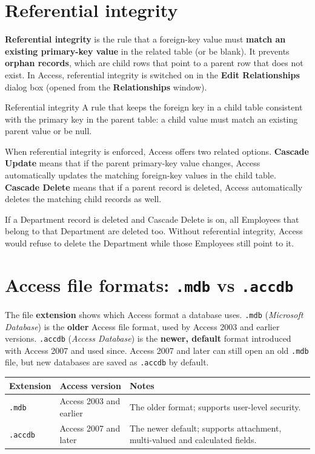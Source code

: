 \section{Referential integrity}
\textbf{Referential integrity} is the rule that a foreign-key value must
\textbf{match an existing primary-key value} in the related table (or be
blank). It prevents \textbf{orphan records}, which are child rows that point to
a parent row that does not exist. In Access, referential integrity is switched
on in the \textbf{Edit Relationships} dialog box (opened from the
\textbf{Relationships} window).

\begin{definitionbox}{Referential integrity}
A rule that keeps the foreign key in a child table consistent with the primary
key in the parent table: a child value must match an existing parent value or
be null.
\end{definitionbox}

When referential integrity is enforced, Access offers two related options.
\textbf{Cascade Update} means that if the parent primary-key value changes,
Access automatically updates the matching foreign-key values in the child
table. \textbf{Cascade Delete} means that if a parent record is deleted, Access
automatically deletes the matching child records as well.

\begin{example}
If a Department record is deleted and Cascade Delete is on, all Employees that
belong to that Department are deleted too. Without referential integrity,
Access would refuse to delete the Department while those Employees still point
to it.
\end{example}

\section{Access file formats: \texttt{.mdb} vs \texttt{.accdb}}
The file \textbf{extension} shows which Access format a database uses.
\texttt{.mdb} (\textit{Microsoft Database}) is the \textbf{older} Access file
format, used by Access 2003 and earlier versions. \texttt{.accdb}
(\textit{Access Database}) is the \textbf{newer, default} format introduced
with Access 2007 and used since. Access 2007 and later can still open an old
\texttt{.mdb} file, but new databases are saved as \texttt{.accdb} by default.

\begin{center}
\begin{tabular}{p{}p{}p{}}
\toprule
\textbf{Extension} & \textbf{Access version} & \textbf{Notes} \\
\midrule
\texttt{.mdb} & Access 2003 and earlier & The older format; supports user-level security. \\
\texttt{.accdb} & Access 2007 and later & The newer default; supports attachment, multi-valued and calculated fields. \\
\bottomrule
\end{tabular}
\end{center}

